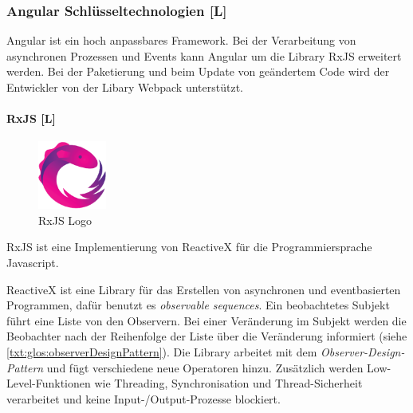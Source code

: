 \subsubsection{Angular Schlüsseltechnologien [L]}
Angular ist ein hoch anpassbares Framework. Bei der Verarbeitung von asynchronen Prozessen und Events kann Angular um die Library RxJS erweitert werden. Bei der Paketierung und beim Update von geändertem Code wird der Entwickler von der Libary Webpack unterstützt. 

\paragraph{RxJS [L]}
\label{RxJS}
\begin{figure}
  \begin{center}
    \includegraphics[width=0.2\textwidth]{pics/RxJs_logo.png}
   \caption{RxJS Logo}
  \end{center}
\end{figure}
RxJS ist eine Implementierung von ReactiveX für die Programmiersprache Javascript.

ReactiveX ist eine Library für das Erstellen von asynchronen und eventbasierten Programmen, dafür benutzt es \emph{observable sequences}. Ein beobachtetes Subjekt führt eine Liste von den Observern. Bei einer Veränderung im Subjekt werden die Beobachter nach der Reihenfolge der Liste über die Veränderung informiert (siehe \ref{txt:glos:observerDesignPattern}).
Die Library arbeitet mit dem \emph{Observer-Design-Pattern} und fügt verschiedene neue Operatoren hinzu. Zusätzlich werden Low-Level-Funktionen wie Threading, Synchronisation und Thread-Sicherheit verarbeitet und keine Input-/Output-Prozesse blockiert. \cite{ReactiveXIntro}

